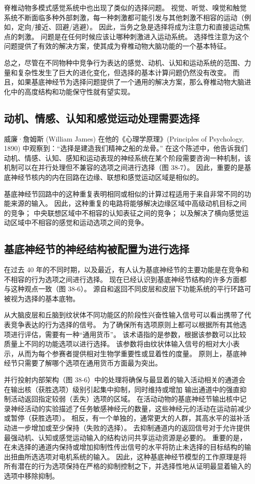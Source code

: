 脊椎动物多模式感觉系统中也出现了类似的选择问题。 视觉、听觉、嗅觉和触觉系统不断面临多种外部刺激，每一种刺激都可能引发与其他刺激不相容的运动（例如，定向/接近、回避/逃避）。 因此，当务之急是选择将成为注意力和直接运动焦点的刺激。 问题是在任何时候应该让哪种刺激进入运动系统。 选择性注意为这个问题提供了有效的解决方案，使其成为脊椎动物大脑功能的一个基本特征。

总之，尽管在不同物种中竞争行为表达的感觉、动机、认知和运动系统的范围、力量和复杂性发生了巨大的进化变化，但选择的基本计算问题仍然没有改变。 而且，如果基底神经节为选择问题提供了一个通用的解决方案，那么脊椎动物大脑进化中的高度结构和功能保守性就有望实现。

\subsection{动机、情感、认知和感觉运动处理需要选择}
威廉·詹姆斯 (William James) 在他的《心理学原理》(Principles of Psychology, 1890) 中观察到：“选择是建造我们精神之船的龙骨。” 在这个陈述中，他告诉我们动机、情感、认知、感知和运动表现的神经系统在某个阶段需要咨询一种机制，该机制可以在并行处理但不兼容的选项之间进行选择（图 38-7）。 因此，重要的是基底神经节核内的内在回路在边缘、联想和感觉运动区域是相似的。

基底神经节回路中的这种重复表明相同或相似的计算过程适用于来自非常不同的功能来源的输入。 因此，这种重复的电路将能够解决边缘区域中高级动机目标之间的竞争； 中央联想区域中不相容的认知表征之间的竞争； 以及解决了横向感觉运动区域中不相容的感觉和运动选项之间的竞争。

\subsection{基底神经节的神经结构被配置为进行选择}
在过去 40 年的不同时期，以及最近，有人认为基底神经节的主要功能是在竞争和不相容的行为选项之间进行选择。 现在已经认识到基底神经节结构的许多方面都与这种观点一致（图 38-6）。 源自和返回不同皮层和皮层下功能系统的平行环路可被视为选择的基本底物。

从大脑皮层和丘脑到纹状体不同功能区的阶段性兴奋性输入信号可以看出携带了代表竞争表达的行为选择的信号。 为了确保所有选项原则上都可以根据所有其他选项进行评估，需要有一种“通用货币”。 该术语指的是参数，根据该参数可以比较质量上不同的功能选项以进行选择。 该参数将由纹状体输入信号的相对大小表示，从而为每个参赛者提供相对生物学重要性或显着性的度量。 原则上，基底神经节只需要了解哪个选项在通用货币方面最为突出。


并行投射内部架构（图 38-6）中的处理将确保与最显着的输入活动相关的通道会在输出核（获胜选项）级别引起集中抑制，同时维持或增加 输出通道中的强直抑制活动返回指定较弱（丢失）选项的区域。 在活动动物的基底神经节输出核中记录神经活动的实验描述了任务敏感神经元的数量，这些神经元的活动在运动前减少或暂停（获胜选项）。 相反，有一个单独的，通常更大的人群，其高水平的滋补活动进一步增加或至少保持（失败的选择）。 去抑制通道内的返回信号对于允许提供最强动机、认知或感觉运动输入的结构访问共享运动资源是必要的。 重要的是，在未选择的通道内保持或增加抑制性传出信号的水平将防止未选择的目标结构的输出扭曲所选选项对电机系统的输入。 因此，这种基底神经节模型的工作原理是将所有潜在的行为选项保持在严格的抑制控制之下，并选择性地从证明最显着输入的选项中移除抑制。

